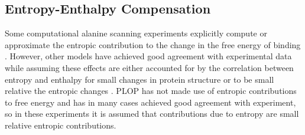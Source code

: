 
\subsection{Entropy-Enthalpy Compensation}
Some computational alanine scanning experiments explicitly compute or approximate the entropic contribution to the change in the free energy of binding \cite{hao2010computational,guerois2002predicting}. 
However, other models have achieved good agreement with experimental data while assuming these effects are either accounted for by the correlation between entropy and enthalpy for small changes in protein structure \cite{sharp2001entropy} or to be small relative the entropic changes \cite{kortemme2004computational}.
PLOP has not made use of entropic contributions to free energy and has in many cases achieved good agreement with experiment, so in these experiments it is assumed that contributions due to entropy are small relative entropic contributions.

